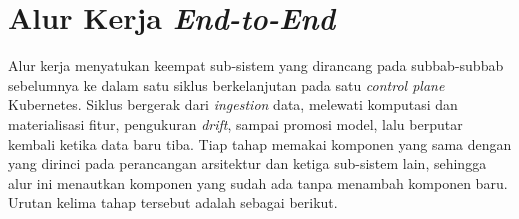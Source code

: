 \section{Alur Kerja \textit{End-to-End}}
\label{sec:alur-e2e}

Alur kerja menyatukan keempat sub-sistem yang dirancang pada subbab-subbab sebelumnya ke dalam satu siklus berkelanjutan pada satu \textit{control plane} Kubernetes. Siklus bergerak dari \textit{ingestion} data, melewati komputasi dan materialisasi fitur, pengukuran \textit{drift}, sampai promosi model, lalu berputar kembali ketika data baru tiba. Tiap tahap memakai komponen yang sama dengan yang dirinci pada perancangan arsitektur dan ketiga sub-sistem lain, sehingga alur ini menautkan komponen yang sudah ada tanpa menambah komponen baru. Urutan kelima tahap tersebut adalah sebagai berikut.

